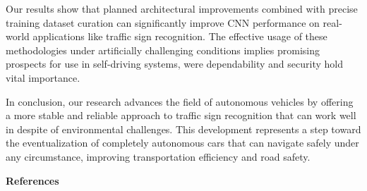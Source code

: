 \begin{multicols}{2}
Our results show that planned architectural improvements combined with
precise training dataset curation can significantly improve CNN
performance on real-world applications like traffic sign recognition.
The effective usage of these methodologies under artificially
challenging conditions implies promising prospects for use in
self-driving systems, were dependability and security hold vital
importance.

In conclusion, our research advances the field of autonomous vehicles by
offering a more stable and reliable approach to traffic sign recognition
that can work well in despite of environmental challenges. This
development represents a step toward the eventualization of completely
autonomous cars that can navigate safely under any circumstance,
improving transportation efficiency and road safety.
\end{multicols}

\begin{center}
{\bfseries References}
\end{center}

